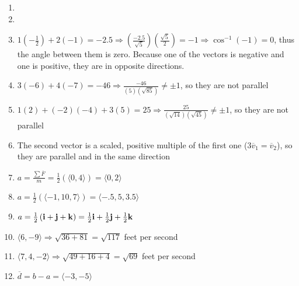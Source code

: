 \begin{enumerate}
\begin{itemize}
    \end{itemize}

    \setcounter{enumi}{8}

  \item

  \item

    \setcounter{enumi}{12}

  \item $1\left( -\frac{1}{2} \right) + 2(-1)=-2.5\Rightarrow \left(\frac{-2.5}{\sqrt{5}}\right)\left( \frac{\sqrt{5}}{2} \right)=-1\Rightarrow \cos^{-1}(-1)=0$, thus the angle between them is zero. Because one of the vectors is negative and one is positive, they are in opposite directions. 

  \item $3(-6)+4(-7)=-46\Rightarrow \frac{-46}{(5)(\sqrt{85})} \neq \pm 1$, so they are not parallel

  \item $1(2)+(-2)(-4)+3(5)=25\Rightarrow\frac{25}{(\sqrt{14})(\sqrt{45})}\neq \pm 1$, so they are not parallel

  \item The second vector is a scaled, positive multiple of the first one ($3\overline{v}_1=\overline{v}_2$), so they are parallel and in the same direction

    \setcounter{enumi}{18}

  \item $a = \frac{\sum \overline{F}}{m}=\frac{1}{2}\left( \langle 0, 4 \rangle \right) = \langle 0, 2 \rangle$

  \item $a = \frac{1}{2}\left( \langle -1, 10, 7 \rangle \right) = \langle -.5, 5, 3.5 \rangle$

  \item $a = \frac{1}{2}\left( \bold{i}+\bold{j}+\bold{k} \right) = \frac{1}{2}\bold{i}+\frac{1}{2}\bold{j}+\frac{1}{2}\bold{k}$

    \setcounter{enumi}{22}

  \item $\langle 6, -9 \rangle \Rightarrow \sqrt{36 + 81} = \sqrt{117}$ feet per second

  \item $\langle 7, 4, -2 \rangle \Rightarrow \sqrt{49 + 16 + 4} = \sqrt{69}$ feet per second

    \setcounter{enumi}{26}

  \item $\overline{d} = b - a = \langle -3, -5 \rangle$
    

\end{enumerate}
